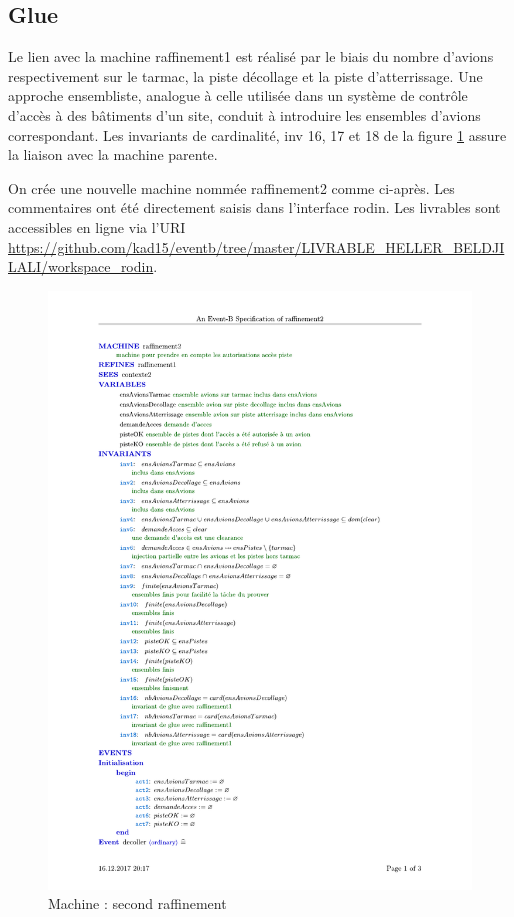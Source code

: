\subsection{Glue} 
Le lien avec la machine raffinement1 est réalisé par le biais du nombre d'avions respectivement sur le tarmac, la piste décollage et la piste d'atterrissage. Une approche ensembliste, analogue à celle utilisée dans un système de contrôle d'accès à des bâtiments d'un site, conduit à introduire les ensembles d'avions correspondant. Les invariants de cardinalité, inv 16, 17 et 18 de la figure \ref{raf21} assure la liaison avec la machine parente. 


On crée une nouvelle machine nommée raffinement2 comme ci-après. Les commentaires ont été directement saisis dans l'interface rodin. Les livrables sont accessibles
en ligne via l'URI \url{https://github.com/kad15/eventb/tree/master/LIVRABLE_HELLER_BELDJILALI/workspace_rodin}.
\begin{figure}[H]
	\begin{center}	
		\includegraphics[scale=0.75]{images/2/raf21.pdf}
		\caption{ Machine : second raffinement}
		\label{raf21}
	\end{center}
\end{figure}

